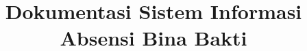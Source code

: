 \documentclass[12pt,a4paper]{article}
\begin{document}
\title{Dokumentasi Sistem Informasi\\Absensi Bina Bakti}
\author{}
\maketitle
\newpage

\tableofcontents
\newpage







\end{document}
